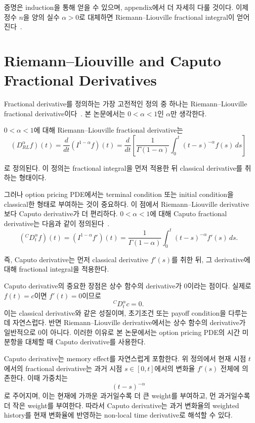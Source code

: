 \documentclass[11pt,a4paper]{report}
\begin{document}
증명은 induction을 통해 얻을 수 있으며, appendix에서 더 자세히 다룰 것이다. 이제 정수 $n$을 양의 실수 $\alpha>0$로 대체하면 Riemann--Liouville fractional integral이 얻어진다~\cite{Podlubny1999}.

\section{Riemann--Liouville and Caputo Fractional Derivatives}

Fractional derivative를 정의하는 가장 고전적인 정의 중 하나는 Riemann--Liouville fractional derivative이다~\cite{Podlubny1999}. 본 논문에서는 $0<\alpha<1$인 $\alpha$만 생각한다.

$0<\alpha<1$에 대해 Riemann--Liouville fractional derivative는
\[
(D_{RL}^{\alpha} f)(t)
=
\frac{d}{dt}
(I^{1-\alpha}f)(t)
=
\frac{d}{dt}
\left[
\frac{1}{\Gamma(1-\alpha)}
\int_0^t
(t-s)^{-\alpha}f(s)\,ds
\right]
\]

로 정의된다. 이 정의는 fractional integral을 먼저 적용한 뒤 classical derivative를 취하는 형태이다.

그러나 option pricing PDE에서는 terminal condition 또는 initial condition을 classical한 형태로 부여하는 것이 중요하다. 이 점에서 Riemann--Liouville derivative보다 Caputo derivative가 더 편리하다. $0<\alpha<1$에 대해 Caputo fractional derivative는 다음과 같이 정의된다~\cite{Caputo1967,Podlubny1999}.
\[
({}^C D_t^\alpha f)(t)
=
(I^{1-\alpha}f')(t)
=
\frac{1}{\Gamma(1-\alpha)}
\int_0^t
(t-s)^{-\alpha}f'(s)\,ds.
\]

즉, Caputo derivative는 먼저 classical derivative $f'(s)$를 취한 뒤, 그 derivative에 대해 fractional integral을 적용한다.

Caputo derivative의 중요한 장점은 상수 함수의 derivative가 0이라는 점이다. 실제로 $f(t)=c$이면 $f'(t)=0$이므로
\[
{}^C D_t^\alpha c = 0.
\]
이는 classical derivative와 같은 성질이며, 초기조건 또는 payoff condition을 다루는 데 자연스럽다. 반면 Riemann--Liouville derivative에서는 상수 함수의 derivative가 일반적으로 0이 아니다. 이러한 이유로 본 논문에서는 option pricing PDE의 시간 미분항을 대체할 때 Caputo derivative를 사용한다.

Caputo derivative는 memory effect를 자연스럽게 포함한다. 위 정의에서 현재 시점 $t$에서의 fractional derivative는 과거 시점 $s\in[0,t]$에서의 변화율 $f'(s)$ 전체에 의존한다. 이때 가중치는
\[
(t-s)^{-\alpha}
\]
로 주어지며, 이는 현재에 가까운 과거일수록 더 큰 weight를 부여하고, 먼 과거일수록 더 작은 weight를 부여한다. 따라서 Caputo derivative는 과거 변화율의 weighted history를 현재 변화율에 반영하는 non-local time derivative로 해석할 수 있다.
\end{document}
